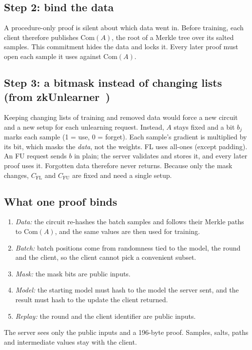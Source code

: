 \documentclass[conference]{IEEEtran}
\begin{document}
\subsection{Step 2: bind the data}
A procedure-only proof is silent about which data went in. Before training, each client therefore
publishes $\mathrm{Com}(A)$, the root of a Merkle tree over its salted samples. This commitment
hides the data and locks it. Every later proof must open each sample it uses against
$\mathrm{Com}(A)$.

\subsection{Step 3: a bitmask instead of changing lists (from zkUnlearner~\cite{zkunlearner})}
Keeping changing lists of training and removed data would force a new circuit and a new setup for
each unlearning request. Instead, $A$ stays fixed and a bit $b_j$ marks each sample (1 = use,
0 = forget). Each sample's gradient is multiplied by its bit, which masks the \emph{data}, not the
weights. FL uses all-ones (except padding). An FU request sends $b$ in plain; the server validates
and stores it, and every later proof uses it. Forgotten data therefore never returns. Because only
the mask changes, $C_{\text{FL}}$ and $C_{\text{FU}}$ are fixed and need a single setup.

\subsection{What one proof binds}
\begin{enumerate}
\item \emph{Data:} the circuit re-hashes the batch samples and follows their Merkle paths to
$\mathrm{Com}(A)$, and the same values are then used for training.
\item \emph{Batch:} batch positions come from randomness tied to the model, the round and the
client, so the client cannot pick a convenient subset.
\item \emph{Mask:} the mask bits are public inputs.
\item \emph{Model:} the starting model must hash to the model the server sent, and the result must
hash to the update the client returned.
\item \emph{Replay:} the round and the client identifier are public inputs.
\end{enumerate}
The server sees only the public inputs and a 196-byte proof. Samples, salts, paths and
intermediate values stay with the client.
\end{document}
